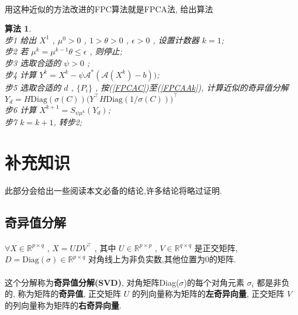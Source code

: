 \documentclass[UTF8]{ctexart}
\newtheorem{algo}{算法}
\numberwithin{equation}{section}
\begin{document}
			\paragraph{}
				\quad 用这种近似的方法改进的FPC算法就是FPCA法, 给出算法
				\begin{algo}
					\quad\\
					步1 \quad 给出 $X^1$ , $\mu^0 > 0$ , $1 > \theta > 0$ , $\epsilon > 0$ , 设置计数器 $k = 1$;\\
					步2 \quad 若 $\mu^k = \mu^{k -1} \theta \le \epsilon$ , 则停止;\\
					步3 \quad 选取合适的 $\psi > 0$ ;\\
					步4 \quad 计算 $Y^k = X^k - \psi \mathcal{A}^*(\mathcal{A}(X^k) - b))$;\\
					步5 \quad 选取合适的 $d$ , $\{P_i\}$ , 按(\ref{FPCAC})至(\ref{FPCAAk}), 计算近似的奇异值分解 $Y_d = H \text{Diag}(\sigma(C)) \big(Y ^\top H \text{Diag}(1/\sigma(C))\big)^\top$\\
					步6 \quad 计算 $X^{k + 1} = S_{\psi \mu^k}(Y_d)$;\\
					步7 \quad $k = k + 1$, 转步2;
				\end{algo}
		


		
	\section{补充知识}
		此部分会给出一些阅读本文必备的结论,许多结论将略过证明.
		\subsection{奇异值分解}
			\paragraph{}
				\quad $\forall X \in \mathbb{R}^{p \times q}$ , $X = U D V^\top$ , 其中 $U \in \mathbb{R}^{p \times p}$ , $V \in \mathbb{R}^{q \times q}$ 是正交矩阵, $ D = \text{Diag}(\sigma) \in \mathbb{R}^{p \times q}$ 对角线上为非负实数,其他位置为0的矩阵.

			\paragraph{}
				\quad 这个分解称为\textbf{奇异值分解(SVD)}, 对角矩阵Diag($\sigma$)的每个对角元素 $\sigma_i$ 都是非负的, 称为矩阵的\textbf{奇异值}, 正交矩阵 $U$ 的列向量称为矩阵的\textbf{左奇异向量}, 正交矩阵 $V$ 的列向量称为矩阵的\textbf{右奇异向量}.
\end{document}
